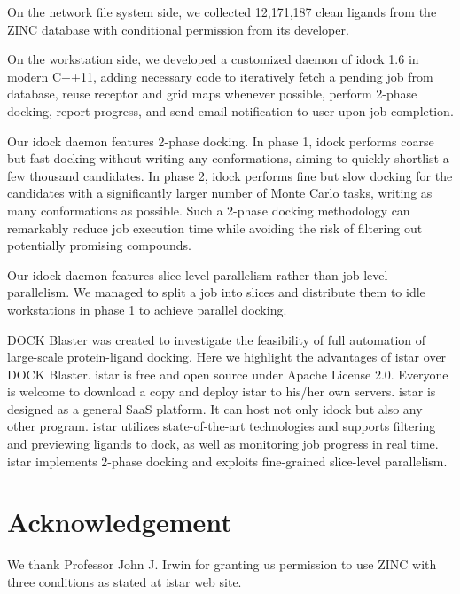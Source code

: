 \documentclass{bioinfo}
\begin{document}
On the network file system side, we collected 12,171,187 clean ligands from the ZINC database \citep{532,1178} with conditional permission from its developer.

On the workstation side, we developed a customized daemon of idock 1.6 in modern C++11, adding necessary code to iteratively fetch a pending job from database, reuse receptor and grid maps whenever possible, perform 2-phase docking, report progress, and send email notification to user upon job completion.

Our idock daemon features 2-phase docking. In phase 1, idock performs coarse but fast docking without writing any conformations, aiming to quickly shortlist a few thousand candidates. In phase 2, idock performs fine but slow docking for the candidates with a significantly larger number of Monte Carlo tasks, writing as many conformations as possible. Such a 2-phase docking methodology can remarkably reduce job execution time while avoiding the risk of filtering out potentially promising compounds.

Our idock daemon features slice-level parallelism rather than job-level parallelism. We managed to split a job into slices and distribute them to idle workstations in phase 1 to achieve parallel docking.

DOCK Blaster \citep{557} was created to investigate the feasibility of full automation of large-scale protein-ligand docking. Here we highlight the advantages of istar over DOCK Blaster. istar is free and open source under Apache License 2.0. Everyone is welcome to download a copy and deploy istar to his/her own servers. istar is designed as a general SaaS platform. It can host not only idock but also any other program. istar utilizes state-of-the-art technologies and supports filtering and previewing ligands to dock, as well as monitoring job progress in real time. istar implements 2-phase docking and exploits fine-grained slice-level parallelism.

\section*{Acknowledgement}

We thank Professor John J. Irwin for granting us permission to use ZINC with three conditions as stated at istar web site.



\end{document}
